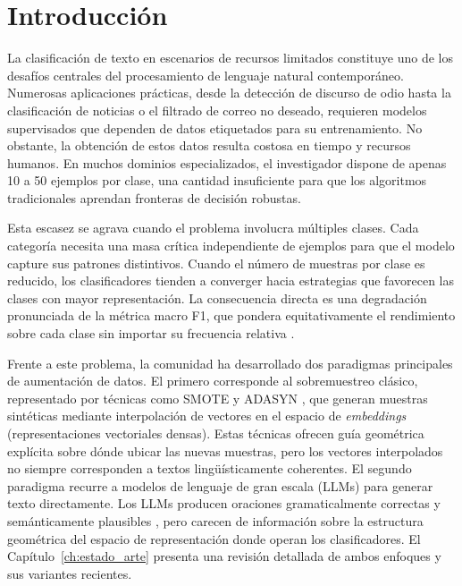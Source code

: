 
\chapter{Introducción}
\label{ch:introduccion}

La clasificación de texto en escenarios de recursos limitados constituye uno de los desafíos centrales del procesamiento de lenguaje natural contemporáneo. Numerosas aplicaciones prácticas, desde la detección de discurso de odio hasta la clasificación de noticias o el filtrado de correo no deseado, requieren modelos supervisados que dependen de datos etiquetados para su entrenamiento. No obstante, la obtención de estos datos resulta costosa en tiempo y recursos humanos. En muchos dominios especializados, el investigador dispone de apenas 10 a 50 ejemplos por clase, una cantidad insuficiente para que los algoritmos tradicionales aprendan fronteras de decisión robustas.

Esta escasez se agrava cuando el problema involucra múltiples clases. Cada categoría necesita una masa crítica independiente de ejemplos para que el modelo capture sus patrones distintivos. Cuando el número de muestras por clase es reducido, los clasificadores tienden a converger hacia estrategias que favorecen las clases con mayor representación. La consecuencia directa es una degradación pronunciada de la métrica macro F1, que pondera equitativamente el rendimiento sobre cada clase sin importar su frecuencia relativa \cite{gopali2024applicability}.

Frente a este problema, la comunidad ha desarrollado dos paradigmas principales de aumentación de datos. El primero corresponde al sobremuestreo clásico, representado por técnicas como SMOTE \cite{chawla2002smote} y ADASYN \cite{he2008adasyn}, que generan muestras sintéticas mediante interpolación de vectores en el espacio de \textit{embeddings} (representaciones vectoriales densas). Estas técnicas ofrecen guía geométrica explícita sobre dónde ubicar las nuevas muestras, pero los vectores interpolados no siempre corresponden a textos lingüísticamente coherentes. El segundo paradigma recurre a modelos de lenguaje de gran escala (LLMs) para generar texto directamente. Los LLMs producen oraciones gramaticalmente correctas y semánticamente plausibles \cite{whitehouse2023llm}, pero carecen de información sobre la estructura geométrica del espacio de representación donde operan los clasificadores. El Capítulo~\ref{ch:estado_arte} presenta una revisión detallada de ambos enfoques y sus variantes recientes.


